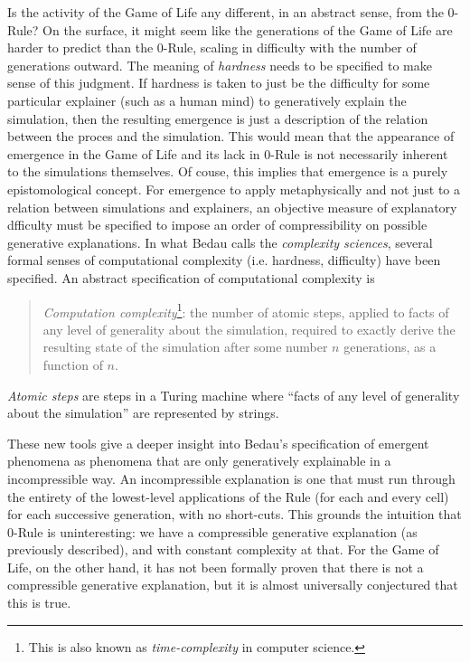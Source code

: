 \documentclass{article}
\newcommand{\ti}[1]{\textit{#1}}
\begin{document}
Is the activity of the Game of Life any different, in an abstract sense, from the $0$-Rule? On the surface, it might seem like the generations of the Game of Life are harder to predict than the $0$-Rule, scaling in difficulty with the number of generations outward. The meaning of \ti{hardness} needs to be specified to make sense of this judgment. If hardness is taken to just be the difficulty for some particular explainer (such as a human mind) to generatively explain the simulation, then the resulting emergence is just a description of the relation between the proces and the simulation. This would mean that the appearance of emergence in the Game of Life and its lack in $0$-Rule is not necessarily inherent to the simulations themselves. Of couse, this implies that emergence is a purely epistomological concept. For emergence to apply metaphysically and not just to a relation between simulations and explainers, an objective measure of explanatory dfficulty must be specified to impose an order of compressibility on possible generative explanations. In what Bedau calls the \ti{complexity sciences}, several formal senses of computational complexity (i.e. hardness, difficulty) have been specified. An abstract specification of computational complexity is

\begin{quote}
\ti{Computation complexity}\footnote{This is also known as \ti{time-complexity} in computer science.}: the number of atomic steps, applied to facts of any level of generality about the simulation, required to exactly derive the resulting state of the simulation after some number $n$ generations, as a function of $n$.
\end{quote}

\ti{Atomic steps} are steps in a Turing machine where ``facts of any level of generality about the simulation'' are represented by strings.

These new tools give a deeper insight into Bedau's specification of emergent phenomena as phenomena that are only generatively explainable in a incompressible way. An incompressible explanation is one that must run through the entirety of the lowest-level applications of the Rule (for each and every cell) for each successive generation, with no short-cuts. This grounds the intuition that $0$-Rule is uninteresting: we have a compressible generative explanation (as previously described), and with constant complexity at that. For the Game of Life, on the other hand, it has not been formally proven that there is not a compressible generative explanation, but it is almost universally conjectured that this is true.
\end{document}
